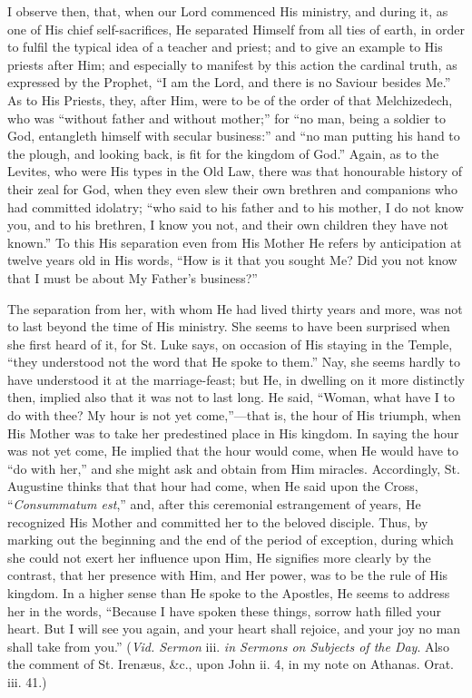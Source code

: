 I observe then, that, when our Lord commenced His ministry, and
during it, as one of His chief self-sacrifices, He separated Himself
from all ties of earth, in order to fulfil the typical idea of a teacher
and priest; and to give an example to His priests after Him; and
especially to manifest by this action the cardinal truth, as expressed
by the Prophet, ``I am the Lord, and there is no Saviour besides
Me.'' As to His Priests, they, after Him, were to be of the order of
that Melchizedech, who was ``without father and without
mother;'' for ``no man, being a soldier to God, entangleth
himself with secular business:'' and ``no man putting his hand
to the plough, and looking back, is fit for the kingdom of God.''
Again, as to the Levites, who were His types in the Old Law, there was
that honourable history of their zeal for God, when they even slew their
own brethren and companions who had committed idolatry; ``who said
to his father and to his mother, I do not know you, and to his brethren,
I know you not, and their own children they have not known.'' To
this His separation even from His Mother He refers by anticipation at
twelve years old in His words, ``How is it that you sought Me? Did
you not know that I must be about My Father's business?''


The separation from her, with whom He had lived thirty years and
more, was not to last beyond the time of His ministry. She seems to have
been surprised when she first heard of it, for St. Luke says, on
occasion of His staying in the Temple, ``they understood not the
word that He spoke to them.'' Nay, she seems hardly to have
understood it at the marriage-feast; but He, in dwelling on it more
distinctly then, implied also that it was not to last long. He said,
``Woman, what have I to do with thee? My hour is not yet come,''—that
is, the hour of His triumph, when His Mother was to take her predestined
place in His kingdom. In saying the hour was not yet come, He implied
that the hour would come, when He would have to ``do with her,''
and she might ask and obtain from Him miracles. Accordingly, St.
Augustine thinks that that hour had come, when He said upon the
Cross, ``\emph{Consummatum est},'' and, after this ceremonial
estrangement of years, He recognized His Mother and committed her to the
beloved disciple. Thus, by marking out the beginning and the end of the
period of exception, during which she could not exert her influence upon
Him, He signifies more clearly by the contrast, that her presence with
Him, and Her power, was to be the rule of His kingdom. In a higher sense
than He spoke to the Apostles, He seems to address her in the words,
``Because I have spoken these things, sorrow hath filled your heart.
But I will see you again, and your heart shall rejoice, and your joy no
man shall take from you.'' (\emph{Vid. Sermon}
iii. \emph{in Sermons on
Subjects of the Day}. Also the comment of St. Irenæus, \&c., upon
John ii. 4, in my note on Athanas. Orat. iii. 41.)


